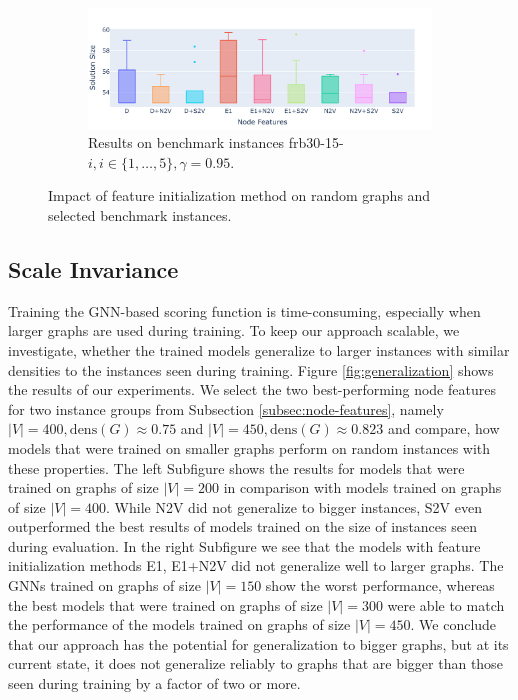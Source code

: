 \documentclass[draft,final]{vutinfth} %
\begin{document}
\begin{figure}
    \begin{subfigure}{0.9\textwidth}
        \centering
        \includegraphics[width=\textwidth]{graphics/V450-082-0825-benchmark.pdf}
        \caption{Results on benchmark instances frb30-15-$i, i \in \{1, \dots, 5\}, \gamma=0.95$.}
    \end{subfigure}
    \caption{Impact of feature initialization method on random graphs and selected benchmark instances.}
    \label{fig:node-features-comparison}
\end{figure}

\subsection{Scale Invariance}
Training the GNN-based scoring function is time-consuming, especially when larger graphs are used during training. To keep our approach scalable, we investigate, whether the trained models generalize to larger instances with similar densities to the instances seen during training. 
Figure \ref{fig:generalization} shows the results of our experiments. We select the two best-performing node features for two instance groups from Subsection \ref{subsec:node-features}, namely $|V|=400, \mathrm{dens}(G) \approx 0.75$ and $|V|=450, \mathrm{dens}(G) \approx 0.823$ and compare, how models that were trained on smaller graphs perform on random instances with these properties. The left Subfigure shows the results for models that were trained on graphs of size $|V| = 200$ in comparison with models trained on graphs of size $|V|=400$. While N2V did not generalize to bigger instances, S2V even outperformed the best results of models trained on the size of instances seen during evaluation. 
In the right Subfigure we see that the models with feature initialization methods E1, E1+N2V did not generalize well to larger graphs. The GNNs trained on graphs of size $|V|=150$ show the worst performance, whereas the best models that were trained on graphs of size $|V|=300$ were able to match the performance of the models trained on graphs of size $|V|=450$.
We conclude that our approach has the potential for generalization to bigger graphs, but at its current state, it does not generalize reliably to graphs that are bigger than those seen during training by a factor of two or more. 
\end{document}
